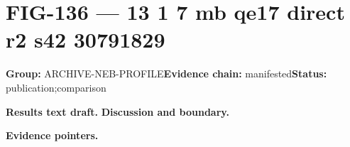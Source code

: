 \clearpage
\section{FIG-136 --- 13 1 7 mb qe17 direct r2 s42 30791829}
\label{figpage:fig-136}
\textbf{Group:} ARCHIVE-NEB-PROFILE\quad \textbf{Evidence chain:} manifested\quad \textbf{Status:} publication;comparison

\textbf{Results text draft.} 
\textbf{Discussion and boundary.} 


\textbf{Evidence pointers.}



\vfill
